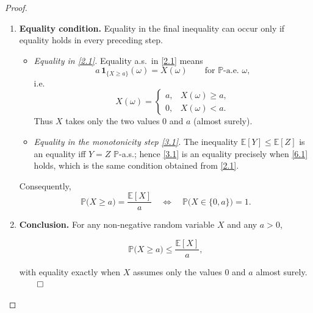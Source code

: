 \begin{proof}
\begin{enumerate}
\item \textbf{Equality condition.}  
Equality in the final inequality can occur only if equality holds in every
preceding step.

\begin{itemize}
\item \emph{Equality in \eqref{2.1}.}  
Equality a.s.\ in \eqref{2.1} means
\[
a\,\mathbf 1_{\{X\ge a\}}(\omega)=X(\omega)\qquad\text{for }\mathbb P\text{-a.e.\ }\omega,
\]
i.e.
\[
X(\omega)=
\begin{cases}
a, & X(\omega)\ge a,\\[2pt]
0, & X(\omega)< a .
\end{cases}
\tag{6.1}
\]
Thus \(X\) takes only the two values \(0\) and \(a\) (almost surely).

\item \emph{Equality in the monotonicity step \eqref{3.1}.}  
The inequality \(\mathbb E[Y]\le\mathbb E[Z]\) is an equality iff
\(Y=Z\) \(\mathbb P\)-a.s.; hence \eqref{3.1} is an equality precisely when
\eqref{6.1} holds, which is the same condition obtained from \eqref{2.1}.
\end{itemize}

Consequently,
\[
\mathbb P\bigl(X\ge a\bigr)=\frac{\mathbb E[X]}{a}
\quad\Longleftrightarrow\quad
\mathbb P\bigl(X\in\{0,a\}\bigr)=1 .
\]

\item \textbf{Conclusion.}  
For any non‑negative random variable \(X\) and any \(a>0\),

\[
\mathbb P\bigl(X\ge a\bigr)\le\frac{\mathbb E[X]}{a},
\]

with equality exactly when \(X\) assumes only the values \(0\) and \(a\)
almost surely. \(\qed\)
\end{enumerate}
\end{proof}